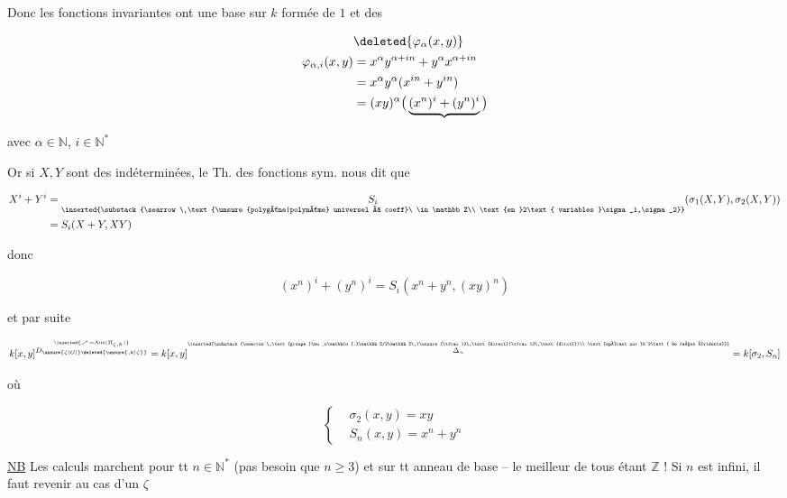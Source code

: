 
Donc les  fonctions  invariantes ont une base sur $k$ formée de $1$ et des

\[\begin{aligned}
&\deleted{\varphi_\alpha(x,y)}\\
\varphi_{\alpha,i}(x,y)&=x^\alpha y^{\alpha+in}+y^\alpha x^{\alpha+in}\\
&=x^\alpha y^\alpha(x^{in}+y^{in})\\
&=(xy)^\alpha\big(\underbrace{(x^n)^i+(y^n)^i}\big)
\end{aligned}\]

avec $\alpha\in\mathbb N$, $i\in\mathbb N^*$

 Or si $X,Y$ sont des indéterminées, le Th. des fonctions sym. nous dit que

\[\begin{aligned}
X^i+Y^i&=\underset{\inserted{\substack{\searrow\ \text{\unsure{polygône|polynôme} universel à coeff}\ \in\mathbb Z\\
\text{en }2\text{ variables }\sigma_1,\sigma_2}}}{S_i}(\sigma_1(X,Y),\sigma_2(X,Y))\\
&=S_i(X+Y,XY)
\end{aligned}\]

donc

\[(x^n)^i+(y^n)^i=S_i(x^n+y^n,(xy)^n)\]

et par suite

\[k[x,y]^{\overset{\inserted{\nearrow\,=\operatorname{Aut}(\Pi_{\zeta,k})}}{D_{\unsure{\zeta|G|{}}\deleted{\unsure{,k|\zeta}}}}}
=k[x,y]^{\overset{\inserted{\substack{\nearrow\,\text{groupe }\mu_n\mathbin{.}\mathbb Z/2\mathbb Z\ (\unsure{\tfrac12\,\text{direct}|\tfrac12\,\text{dirct}})\\
\text{opérant sur }k^2\text{ de façon évidente}}}}{\Delta_n}}=k[\sigma_2,S_n]\]

où

\[\left\{\begin{aligned}
&\sigma_2(x,y)=xy\\
&S_n(x,y)=x^n+y^n
\end{aligned}\right.\]

\uline{NB} Les calculs marchent pour tt $n\in\mathbb N^*$ (pas besoin que $n\geq3$) et sur tt anneau de base -- le meilleur de tous étant $\mathbb Z$ ! Si $n$ est infini, il faut revenir au cas d'un $\zeta$


